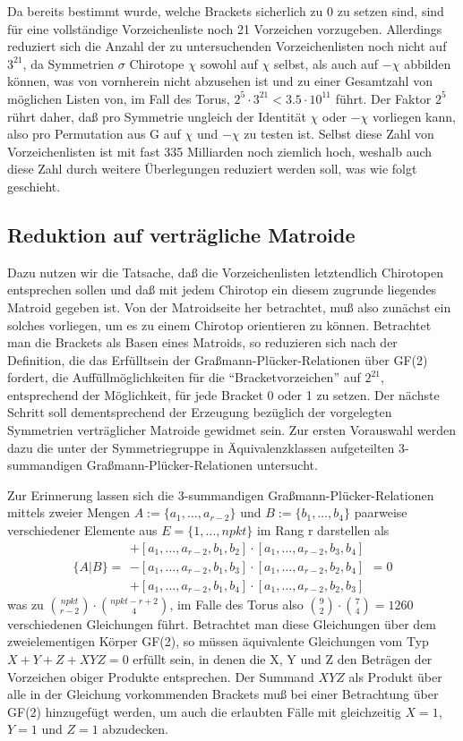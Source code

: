 Da bereits bestimmt wurde, welche Brackets sicherlich zu 0 zu setzen sind,
sind für eine vollständige Vorzeichenliste noch 21 Vorzeichen vorzugeben.
Allerdings reduziert sich die Anzahl der zu untersuchenden Vorzeichenlisten
noch nicht auf $3^{21}$, da Symmetrien $\sigma$ Chirotope $\chi$ sowohl auf
$\chi$ selbst, als auch auf $-\chi$ abbilden können, was von vornherein
nicht abzusehen ist und zu einer Gesamtzahl von möglichen Listen von, im Fall
des Torus, $2^5\cdot 3^{21}< 3.5\cdot 10^{11}$ führt. Der Faktor $2^5$ rührt
daher, daß pro Symmetrie ungleich der Identität $\chi$ oder $-\chi$ vorliegen
kann, also pro Permutation aus G auf $\chi$ und $-\chi$ zu testen ist.
\label{symmtest} Selbst diese Zahl von Vorzeichenlisten ist mit fast 335
Milliarden noch ziemlich hoch, weshalb auch diese Zahl durch weitere
Überlegungen reduziert werden soll, was wie folgt geschieht.

\subsection{Reduktion auf verträgliche Matroide}

Dazu nutzen wir die Tatsache, daß die Vorzeichenlisten letztendlich Chirotopen
entsprechen sollen und daß mit jedem Chirotop ein diesem zugrunde liegendes
Matroid gegeben ist. Von der Matroidseite her betrachtet, muß also zunächst
ein solches vorliegen, um es zu einem Chirotop orientieren zu können.
Betrachtet man die Brackets als Basen eines Matroids, so reduzieren sich nach
der Definition, die das Erfülltsein der Graßmann-Plücker-Relationen über
GF(2) fordert, die Auffüllmöglichkeiten für die "`Bracketvorzeichen"' auf
$2^{21}$, entsprechend der Möglichkeit, für jede Bracket 0 oder 1 zu setzen.
Der nächste Schritt soll dementsprechend der Erzeugung bezüglich der
vorgelegten Symmetrien verträglicher Matroide gewidmet sein. Zur ersten
Vorauswahl werden dazu die unter der Symmetriegruppe in Äquivalenzklassen
aufgeteilten 3-summandigen Graßmann-Plücker-Relationen untersucht.

Zur Erinnerung lassen sich die 3-summandigen Graßmann-Plücker-Relationen
mittels zweier Mengen $A:=\{a_1,\ldots,a_{r-2}\}$ und $B:=\{b_1,\ldots,b_4\}$
paarweise verschiedener Elemente aus $E=\{1,\ldots,npkt\}$ im Rang r
darstellen als
$$\{A|B\}=
  \begin{array}{l}
    +[a_1,\ldots,a_{r-2},b_1,b_2]\cdot [a_1,\ldots,a_{r-2},b_3,b_4]\\
    -[a_1,\ldots,a_{r-2},b_1,b_3]\cdot [a_1,\ldots,a_{r-2},b_2,b_4]\\
    +[a_1,\ldots,a_{r-2},b_1,b_4]\cdot [a_1,\ldots,a_{r-2},b_2,b_3]
  \end{array}=0$$
was zu ${npkt \choose r-2}\cdot{npkt-r+2 \choose 4}$, im Falle des Torus also
${9\choose 2}\cdot{7\choose 4}=1260$ verschiedenen Gleichungen führt.
Betrachtet man diese Gleichungen über dem zweielementigen Körper GF(2), so
müssen äquivalente Gleichungen vom Typ $X + Y + Z + XYZ = 0$ erfüllt sein, in
denen die X, Y und Z den Beträgen der Vorzeichen obiger Produkte entsprechen.
Der Summand $XYZ$ als Produkt über alle in der Gleichung vorkommenden Brackets
muß bei einer Betrachtung über GF(2) hinzugefügt werden, um auch die
erlaubten Fälle mit gleichzeitig $X=1$, $Y=1$ und $Z=1$ abzudecken.

